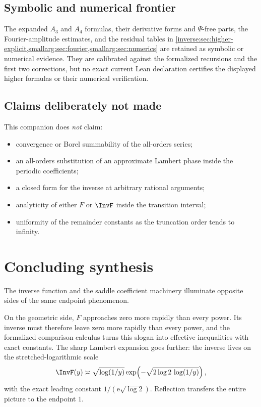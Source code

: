 \documentclass[11pt,oneside]{article}
\theoremstyle{definition}
\theoremstyle{remark}
\newcommand{\e}{\mathrm e}
\begin{document}
\subsection{Symbolic and numerical frontier}

The expanded \(A_3\) and \(A_4\) formulas, their derivative forms and
\(\Psi\)-free parts, the Fourier-amplitude estimates, and the residual tables in
\cref{inverse:sec:higher-explicit,smallarg:sec:fourier,smallarg:sec:numerics} are retained as
symbolic or numerical evidence.  They are calibrated against the formalized recursions and
the first two corrections, but no exact current Lean declaration certifies the displayed
higher formulas or their numerical verification.

\subsection{Claims deliberately not made}

This companion does \emph{not} claim:
\begin{itemize}
\item convergence or Borel summability of the all-orders series;
\item an all-orders substitution of an approximate Lambert phase inside
the periodic coefficients;
\item a closed form for the inverse at arbitrary rational arguments;
\item analyticity of either $F$ or $\InvF$ inside the transition interval;
\item uniformity of the remainder constants as the truncation order tends
to infinity.
\end{itemize}

\section{Concluding synthesis}

The inverse function and the saddle coefficient machinery illuminate
opposite sides of the same endpoint phenomenon.

On the geometric side, $F$ approaches zero more rapidly than every
power.  Its inverse must therefore leave zero more rapidly than every
power, and the formalized comparison calculus turns this slogan into
effective inequalities with exact constants.  The sharp Lambert
expansion goes further: the inverse lives on the
stretched-logarithmic scale
\[
 \InvF(y)\asymp
 \sqrt{\log(1/y)}
 \exp\!\left(-\sqrt{2\log2\,\log(1/y)}\right),
\]
with the exact leading constant $1/(\e\sqrt{\log2})$.  Reflection transfers
the entire picture to the endpoint $1$.
\end{document}
